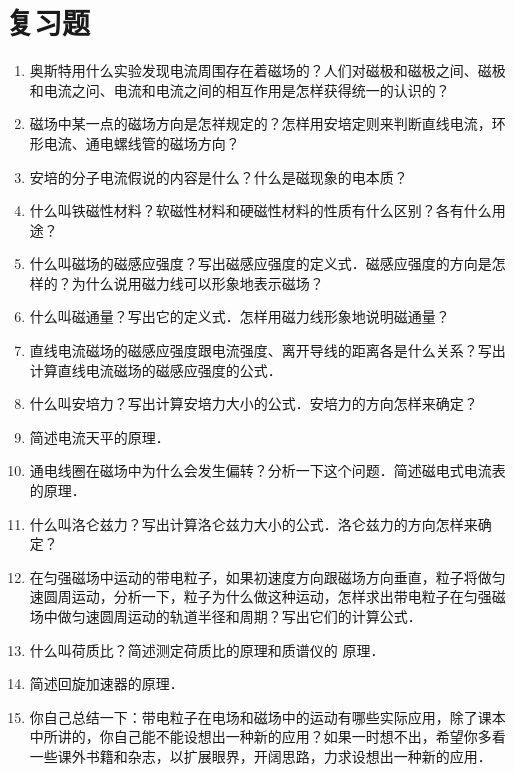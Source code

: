 \section*{复习题}
\begin{enumerate}
    \item 奥斯特用什么实验发现电流周围存在着磁场的？人们对磁极和磁极之间、磁极和电流之问、电流和电流之间的相互作用是怎样获得统一的认识的？
    \item 磁场中某一点的磁场方向是怎祥规定的？怎样用安培定则来判断直线电流，环形电流、通电螺线管的磁场方向？
    \item 安培的分子电流假说的内容是什么？什么是磁现象的电本质？
    \item 什么叫铁磁性材料？软磁性材料和硬磁性材料的性质有什么区别？各有什么用途？
    \item 什么叫磁场的磁感应强度？写出磁感应强度的定义式．磁感应强度的方向是怎样的？为什么说用磁力线可以形象地表示磁场？
    \item 什么叫磁通量？写出它的定义式．怎样用磁力线形象地说明磁通量？
    
    \item 直线电流磁场的磁感应强度跟电流强度、离开导线的距离各是什么关系？写出计算直线电流磁场的磁感应强度的公式．
    \item 什么叫安培力？写出计算安培力大小的公式．安培力的方向怎样来确定？
    \item 简述电流天平的原理．\item 通电线圈在磁场中为什么会发生偏转？分析一下这个问题．简述磁电式电流表的原理．
    \item 什么叫洛仑兹力？写出计算洛仑兹力大小的公式．洛仑兹力的方向怎样来确定？
    \item 在匀强磁场中运动的带电粒子，如果初速度方向跟磁场方向垂直，粒子将做匀速圆周运动，分析一下，粒子为什么做这种运动，怎样求出带电粒子在匀强磁场中做匀速圆周运动的轨道半径和周期？写出它们的计算公式．
    \item 什么叫荷质比？简述测定荷质比的原理和质谱仪的
    原理．
    \item 简述回旋加速器的原理．\item 你自己总结一下：带电粒子在电场和磁场中的运动有哪些实际应用，除了课本中所讲的，你自己能不能设想出一种新的应用？如果一时想不出，希望你多看一些课外书籍和杂志，以扩展眼界，开阔思路，力求设想出一种新的应用．
\end{enumerate}

